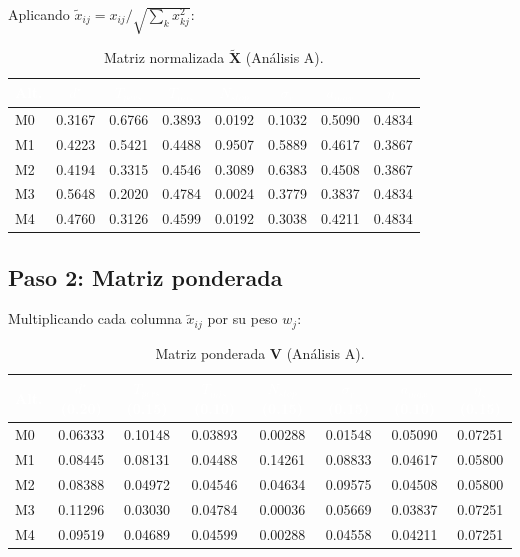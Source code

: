\documentclass[12pt,a4paper,oneside]{book}
\begin{document}
Aplicando $\tilde{x}_{ij} = x_{ij}/\sqrt{\sum_k x_{kj}^2}$:

\begin{table}[H]
\centering
\caption{Matriz normalizada $\tilde{\mathbf{X}}$ (Análisis A).}
\renewcommand{\arraystretch}{1.3}
\small
\begin{tabular}{lccccccc}
\toprule
\rowcolor{primary}
\textcolor{white}{\textbf{Alt.}} &
\textcolor{white}{$d^\star$} &
\textcolor{white}{$T_{pers}$} &
\textcolor{white}{$T_{mis}$} &
\textcolor{white}{$N_{stop}$} &
\textcolor{white}{$\sigma_v$} &
\textcolor{white}{$a_{max}$} &
\textcolor{white}{$\eta_s$} \\
\midrule
M0 & 0.3167 & 0.6766 & 0.3893 & 0.0192 & 0.1032 & 0.5090 & 0.4834 \\
M1 & 0.4223 & 0.5421 & 0.4488 & 0.9507 & 0.5889 & 0.4617 & 0.3867 \\
M2 & 0.4194 & 0.3315 & 0.4546 & 0.3089 & 0.6383 & 0.4508 & 0.3867 \\
M3 & 0.5648 & 0.2020 & 0.4784 & 0.0024 & 0.3779 & 0.3837 & 0.4834 \\
M4 & 0.4760 & 0.3126 & 0.4599 & 0.0192 & 0.3038 & 0.4211 & 0.4834 \\
\bottomrule
\end{tabular}
\end{table}

\subsection{Paso 2: Matriz ponderada}

Multiplicando cada columna $\tilde{x}_{ij}$ por su peso $w_j$:

\begin{table}[H]
\centering
\caption{Matriz ponderada $\mathbf{V}$ (Análisis A).}
\renewcommand{\arraystretch}{1.3}
\small
\begin{tabular}{lccccccc}
\toprule
\rowcolor{primary}
\textcolor{white}{\textbf{Alt.}} &
\textcolor{white}{$d^\star$ (0.20)} &
\textcolor{white}{$T_{pers}$ (0.15)} &
\textcolor{white}{$T_{mis}$ (0.10)} &
\textcolor{white}{$N_{stop}$ (0.15)} &
\textcolor{white}{$\sigma_v$ (0.15)} &
\textcolor{white}{$a_{max}$ (0.10)} &
\textcolor{white}{$\eta_s$ (0.15)} \\
\midrule
M0 & 0.06333 & 0.10148 & 0.03893 & 0.00288 & 0.01548 & 0.05090 & 0.07251 \\
M1 & 0.08445 & 0.08131 & 0.04488 & 0.14261 & 0.08833 & 0.04617 & 0.05800 \\
M2 & 0.08388 & 0.04972 & 0.04546 & 0.04634 & 0.09575 & 0.04508 & 0.05800 \\
M3 & 0.11296 & 0.03030 & 0.04784 & 0.00036 & 0.05669 & 0.03837 & 0.07251 \\
M4 & 0.09519 & 0.04689 & 0.04599 & 0.00288 & 0.04558 & 0.04211 & 0.07251 \\
\bottomrule
\end{tabular}
\end{table}
\end{document}
